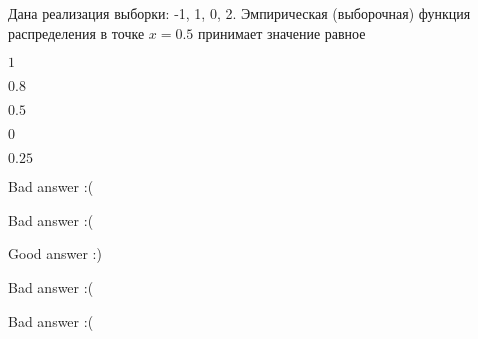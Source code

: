 
\begin{question}
Дана реализация выборки: -1, 1, 0, 2. Эмпирическая (выборочная) функция
распределения в точке \(x=0.5\) принимает значение равное
\begin{answerlist}
  \item \(1\)
  \item \(0.8\)
  \item \(0.5\)
  \item \(0\)
  \item \(0.25\)
\end{answerlist}
\end{question}

\begin{solution}
\begin{answerlist}
  \item Bad answer :(
  \item Bad answer :(
  \item Good answer :)
  \item Bad answer :(
  \item Bad answer :(
\end{answerlist}
\end{solution}


